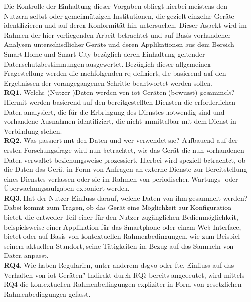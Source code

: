 
\noindent Die Kontrolle der Einhaltung dieser Vorgaben obliegt hierbei meistens den Nutzern selbst oder gemeinnützigen Institutionen, die gezielt einzelne Geräte identifizieren und auf deren Konformität hin untersuchen. Dieser Aspekt wird im Rahmen der hier vorliegenden Arbeit betrachtet und auf Basis vorhandener Analysen unterschiedlicher Geräte und deren Applikationen aus dem Bereich Smart Home und Smart City bezüglich deren Einhaltung geltender Datenschutzbestimmungen ausgewertet. Bezüglich dieser allgemeinen Fragestellung werden die nachfolgenden \ac{rq} definiert, die basierend auf den Ergebnissen der vorangegangenen Schritte beantwortet werden sollen.\\
\textbf{RQ1.} Welche (Nutzer-)Daten werden von \ac{iot}-Geräten (bewusst) gesammelt? Hiermit werden basierend auf den bereitgestellten Diensten die erforderlichen Daten analysiert, die für die Erbringung des Dienstes notwendig sind und vorhandene Ausnahmen identifiziert, die nicht unmittelbar mit dem Dienst in Verbindung stehen.\\
\textbf{RQ2.} Was passiert mit den Daten und wer verwendet sie? Aufbauend auf der ersten Forschungsfrage wird nun betrachtet, wie das Gerät die nun vorhandenen Daten verwaltet beziehungsweise prozessiert. Hierbei wird speziell betrachtet, ob die Daten das Gerät in Form von Anfragen an externe Dienste zur Bereitstellung eines Dienstes verlassen oder sie im Rahmen von periodischen Wartungs- oder Überwachungsaufgaben exponiert werden.\\
\textbf{RQ3}. Hat der Nutzer Einfluss darauf, welche Daten von ihm gesammelt werden? Dabei kommt zum Tragen, ob das Gerät eine Möglichkeit zur Konfiguration bietet, die entweder Teil einer für den Nutzer zugänglichen Bedienmöglichkeit, beispielsweise einer Applikation für das Smartphone oder einem Web-Interface, bietet oder auf Basis von kontextuellen Rahmenbedingungen, wie zum Beispiel seinem aktuellen Standort, seine Tätigkeiten im Bezug auf das Sammeln von Daten anpasst.\\
\textbf{RQ4.} Wie haben Regularien, unter anderem \ac{dsgvo} oder \ac{ftc}, Einfluss auf das Verhalten von \ac{iot}-Geräten? Indirekt durch RQ3 bereits angedeutet, wird mittels RQ4 die kontextuellen Rahmenbedingungen expliziter in Form von gesetzlichen Rahmenbedingungen gefasst.\\
